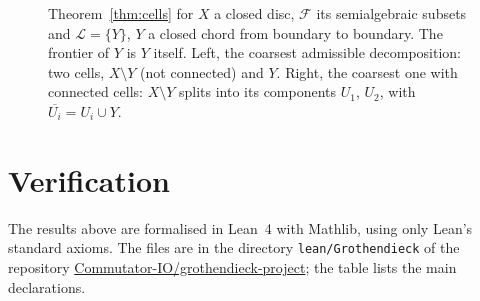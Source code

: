 \documentclass[11pt,a4paper]{amsart}
\theoremstyle{definition}
\theoremstyle{remark}
\begin{document}
\begin{figure}[ht]
\centering
{}
\caption{Theorem~\ref{thm:cells} for $X$ a closed disc, $\mathcal F$ its semialgebraic subsets and $\mathcal L = \{Y\}$, $Y$ a closed chord from boundary to boundary. The frontier of $Y$ is $Y$ itself. Left, the coarsest admissible decomposition: two cells, $X \setminus Y$ (not connected) and $Y$. Right, the coarsest one with connected cells: $X \setminus Y$ splits into its components $U_1$, $U_2$, with $\overline{U_i} = U_i \cup Y$.}\label{fig:cells}
\end{figure}

\section{Verification}\label{sec:lean}
The results above are formalised in Lean~4 with Mathlib, using only Lean's standard axioms. The files are in the directory \mbox{\texttt{lean/Grothendieck}} of the repository \href{https://github.com/Commutator-IO/grothendieck-project}{Commutator-IO/grothendieck-project}; the table lists the main declarations.
\end{document}
